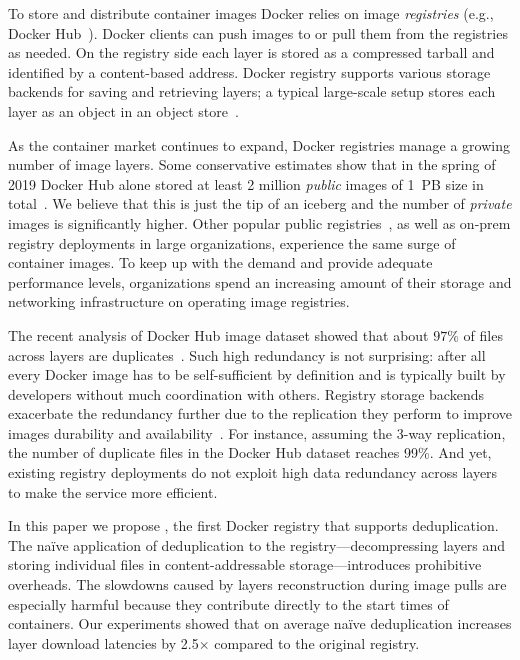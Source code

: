To store and distribute container images Docker relies on image
\emph{registries} (e.g., Docker Hub~\cite{docker-hub}).
%
Docker clients can push images to or pull them from the registries as needed.
%
On the registry side each layer is stored as a compressed tarball and
identified by a content-based address.
%
Docker registry supports various storage backends for saving and retrieving
layers; a typical large-scale setup stores each layer as an object in an object
store~\cite{s3,swift}.

As the container market continues to expand, Docker registries manage a
growing number of image layers.
%
Some conservative estimates show that in the spring of 2019 Docker Hub alone
stored at least 2 million \emph{public} images of 1~PB size in
total~\cite{skourtis2019carving,dedupanalysis}. 
%
We believe that this is just the tip of an iceberg and the number of
\emph{private} images is significantly higher.
%
Other popular public
registries~\cite{amazon-ecr,jfrog-artifactory,azure-cr,google-cr}, as well as
on-prem registry deployments in large organizations, experience the same
surge of container images.
%
To keep up with the demand and provide adequate performance levels,
organizations spend an increasing amount of their storage and networking
infrastructure on operating image registries.
%
%

The recent analysis of
Docker Hub image dataset showed that about $97$\% of files across layers are
duplicates~\cite{dedupanalysis}.
%
Such high redundancy is not surprising: after all every Docker image has to be
self-sufficient by definition and is typically built by developers without much
coordination with others.
%
Registry storage backends exacerbate the redundancy further due to the
replication they perform to improve images durability and
availability~\cite{Bonvin:2010:SFS:1807128.1807162}.
%
For instance, assuming the 3-way replication, the number of duplicate files in the
Docker Hub dataset reaches 99\%.
%
And yet, existing registry deployments do not exploit high data redundancy
across layers to make the service more efficient.


In this paper we propose \emph{\sysname}, the first Docker registry that
supports deduplication.
%
The na\"{i}ve application of deduplication to the registry---decompressing
layers and storing individual files in content-addressable storage---introduces
prohibitive overheads.
%
The slowdowns caused by layers reconstruction during image pulls are especially
harmful because they contribute directly to the start times of containers.
%
Our experiments showed that on average na\"{i}ve deduplication increases layer
download latencies by 2.5$\times$ compared to the original registry.

